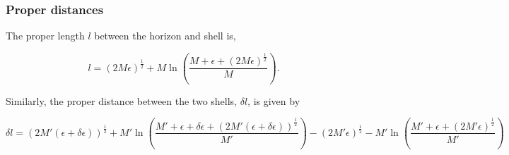\documentclass[aps,showpacs,twocolumn,floats,prd,superscriptaddress,nofootinbib]{revtex4-1}
\begin{document}
%

%
%
%
%
%
%

\subsubsection{Proper distances}

The proper length $l$ between the horizon and shell is,

\begin{equation}
	l =  (2M \epsilon)^\frac{1}{2}  + M \ln \left( \frac{M + \epsilon + (2M\epsilon)^\frac{1}{2}}{M} \right).	\label{20}
\end{equation}

Similarly, the proper distance between the two shells, $\delta l$, is given by

\begin{equation}
	\delta l = (2M'(\epsilon + \delta \epsilon))^{\frac{1}{2}} + M' \ln \left(\frac{M' + \epsilon + \delta \epsilon + (2M'(\epsilon +\delta \epsilon))^{\frac{1}{2}}}{M'} \right) - (2M'\epsilon)^\frac{1}{2} - M' \ln \left( \frac{M' + \epsilon + (2M' \epsilon)^\frac{1}{2}}{M'} \right)	\label{21}
\end{equation}
	
\end{document}

